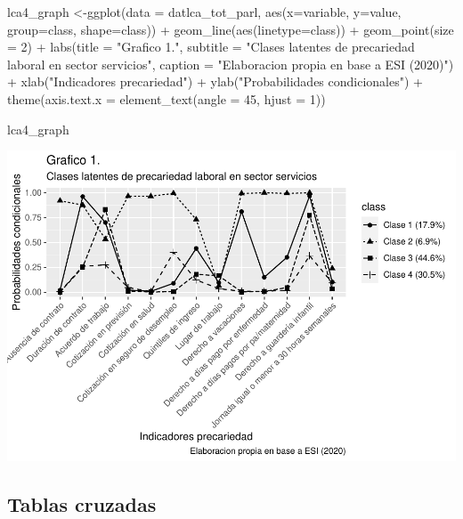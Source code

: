 \documentclass[
]{article}
\newenvironment{Shaded}{\begin{snugshade}}{\end{snugshade}}
\newcommand{\AttributeTok}[1]{\textcolor[rgb]{0.77,0.63,0.00}{#1}}
\newcommand{\DecValTok}[1]{\textcolor[rgb]{0.00,0.00,0.81}{#1}}
\newcommand{\FunctionTok}[1]{\textcolor[rgb]{0.00,0.00,0.00}{#1}}
\newcommand{\NormalTok}[1]{#1}
\newcommand{\OtherTok}[1]{\textcolor[rgb]{0.56,0.35,0.01}{#1}}
\newcommand{\SpecialCharTok}[1]{\textcolor[rgb]{0.00,0.00,0.00}{#1}}
\newcommand{\StringTok}[1]{\textcolor[rgb]{0.31,0.60,0.02}{#1}}
\begin{document}
\begin{Shaded}
\begin{Highlighting}[]
\NormalTok{lca4\_graph }\OtherTok{\textless{}{-}}\FunctionTok{ggplot}\NormalTok{(}\AttributeTok{data =}\NormalTok{ datlca\_tot\_parl, }\FunctionTok{aes}\NormalTok{(}\AttributeTok{x=}\NormalTok{variable, }\AttributeTok{y=}\NormalTok{value, }\AttributeTok{group=}\NormalTok{class, }\AttributeTok{shape=}\NormalTok{class)) }\SpecialCharTok{+} 
      \FunctionTok{geom\_line}\NormalTok{(}\FunctionTok{aes}\NormalTok{(}\AttributeTok{linetype=}\NormalTok{class)) }\SpecialCharTok{+} \FunctionTok{geom\_point}\NormalTok{(}\AttributeTok{size =} \DecValTok{2}\NormalTok{) }\SpecialCharTok{+}
      \FunctionTok{labs}\NormalTok{(}\AttributeTok{title =} \StringTok{"Grafico 1."}\NormalTok{, }
           \AttributeTok{subtitle =} \StringTok{"Clases latentes de precariedad laboral en sector servicios"}\NormalTok{,}
           \AttributeTok{caption =} \StringTok{"Elaboracion propia en base a ESI (2020)"}\NormalTok{) }\SpecialCharTok{+} 
      \FunctionTok{xlab}\NormalTok{(}\StringTok{"Indicadores precariedad"}\NormalTok{) }\SpecialCharTok{+} 
      \FunctionTok{ylab}\NormalTok{(}\StringTok{"Probabilidades condicionales"}\NormalTok{) }\SpecialCharTok{+}
  \FunctionTok{theme}\NormalTok{(}\AttributeTok{axis.text.x =} \FunctionTok{element\_text}\NormalTok{(}\AttributeTok{angle =} \DecValTok{45}\NormalTok{, }\AttributeTok{hjust =} \DecValTok{1}\NormalTok{))}
    
\NormalTok{lca4\_graph}
\end{Highlighting}
\end{Shaded}

\includegraphics{informe_files/figure-latex/model_graph-1.pdf}

\hypertarget{tablas-cruzadas}{%
\subsection{Tablas cruzadas}\label{tablas-cruzadas}}
\end{document}
